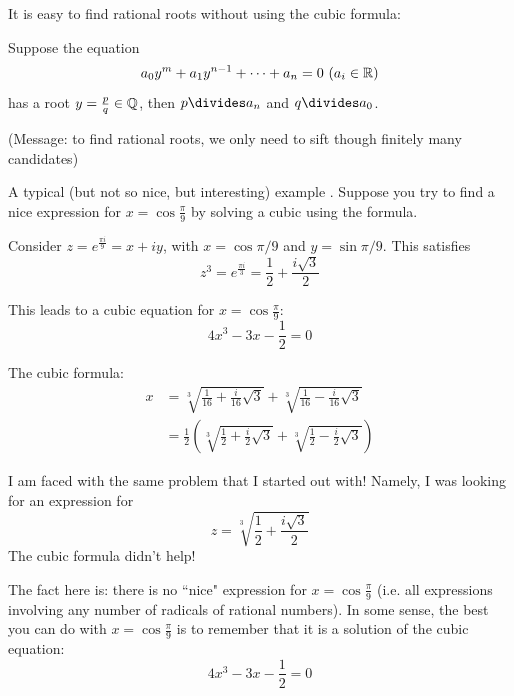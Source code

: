 \documentclass[10pt]{scrartcl}
\begin{document}
It is easy to find rational roots without using the cubic formula: 

\begin{proposition}
Suppose the equation
\[a_0y^m + a_1y^{n-1} +\dots + a_n = 0 ~(a_i \in \mathbb{R})\]	
has a root $y = \frac{p}{q} \in\mathbb{Q}$, then $p \divides a_n$ and $q \divides a_0$. 
\end{proposition}

(Message: to find rational roots, we only need to sift though finitely many candidates)\\


\begin{example}
A typical (but not so nice, but interesting) example	. Suppose you try to find a nice expression for $x = \cos\frac{\pi}{9}$ by solving a cubic using the formula. 


\begin{center}
\end{center}

Consider $z = e^{\frac{\pi i}{9}} =x +iy$, with $x = \cos\pi/9$ and $y = \sin\pi/9$. This satisfies 
\[
  z^3 = e^{\frac{\pi i}{3}} = \frac{1}{2} + \frac{i\sqrt{3}}{2}
\]


This leads to a cubic equation for $x = \cos\frac{\pi}{9}$: 
\[4x^3 - 3x - \frac{1}{2} = 0\]

The cubic formula: 
\[
\begin{aligned}
  x &= \sqrt[3]{\frac{1}{16} + \frac{i}{16}\sqrt{3}} + \sqrt[3]{\frac{1}{16} - \frac{i}{16}\sqrt{3}}\\
  &= \frac{1}{2}\left(\sqrt[3]{\frac{1}{2} + \frac{i}{2}\sqrt{3}} + \sqrt[3]{\frac{1}{2} - \frac{i}{2}\sqrt{3}} \right)
\end{aligned}
\]

I am faced with the same problem that I started out with! Namely, I was looking for an expression for 
\[z = \sqrt[3]{\frac{1}{2} + \frac{i\sqrt{3}}{2}}\]
The cubic formula didn't help!

The fact here is: there is no ``nice" expression for $x = \cos\frac{\pi}{9}$ (i.e. all expressions involving any number of radicals of rational numbers). In some sense, the best you can do with $x = \cos\frac{\pi}{9}$ is to remember that it is a solution of the cubic equation:
\[4x^3 -3x - \frac{1}{2} = 0\]
\end{example}\vspace*{10pt}
\end{document}
